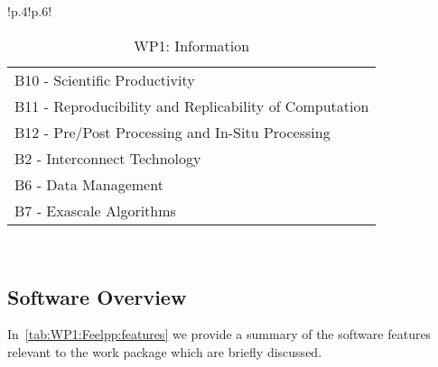 \begin{table}[h!]
{{\begin{tabular}{!{\color{numpexgray}\vrule}p{.4\textwidth}!{\color{numpexgray}\vrule}p{.6\textwidth}!{\color{numpexgray}\vrule}}
\begin{tabular}{l}
B10 - Scientific Productivity\\
B11 - Reproducibility and Replicability of Computation\\
B12 - Pre/Post Processing and In-Situ Processing\\
B2 - Interconnect Technology\\
B6 - Data Management\\
B7 - Exascale Algorithms\\
\end{tabular} \\
        \bottomrule
    \end{tabular}
    }}
    \caption{WP1: \Feelpp{} Information}
\end{table}

\subsection{Software Overview}
\label{sec:WP1:Feelpp:summary}

In~\cref{tab:WP1:Feelpp:features} we provide a summary of the software features relevant to the work package which are briefly discussed.

